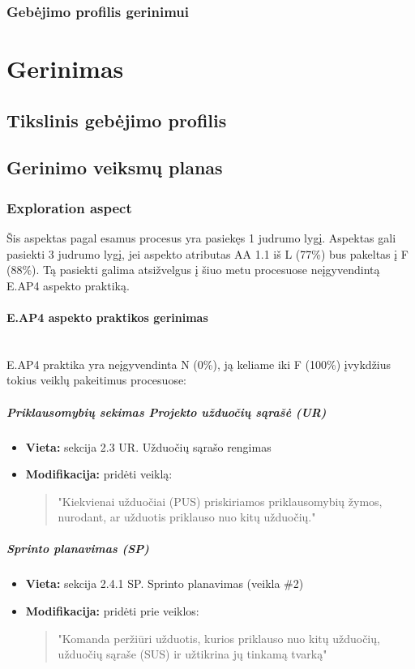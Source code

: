\documentclass{article}
\newcommand{\subsubsubsection}[1]{\paragraph{#1}\mbox{}\\}
\begin{document}
\subsubsection{Gebėjimo profilis gerinimui}


\section{Gerinimas}

\subsection{Tikslinis gebėjimo profilis}

\subsection{Gerinimo veiksmų planas}

\subsubsection{Exploration aspect}

Šis aspektas pagal esamus procesus yra pasiekęs 1 judrumo lygį. Aspektas gali pasiekti 3 judrumo lygį, jei aspekto atributas
AA 1.1 iš L (77\%) bus pakeltas į F (88\%). Tą pasiekti galima atsižvelgus į šiuo metu procesuose neįgyvendintą E.AP4 aspekto praktiką.

\pagebreak
\subsubsubsection{E.AP4 aspekto praktikos gerinimas}

E.AP4 praktika yra neįgyvendinta N (0\%), ją keliame iki F (100\%) įvykdžius tokius veiklų pakeitimus procesuose:

\subparagraph{Priklausomybių sekimas Projekto užduočių sąrašė (UR)}
\begin{itemize}
    \item \textbf{Vieta:} sekcija 2.3 UR. Užduočių sąrašo rengimas
    \item \textbf{Modifikacija:} pridėti veiklą:
    \begin{quote}
        "Kiekvienai užduočiai (PUS) priskiriamos priklausomybių žymos, nurodant, ar užduotis priklauso nuo kitų užduočių."
    \end{quote}
\end{itemize}

\subparagraph{Sprinto planavimas (SP)}
\begin{itemize}
    \item \textbf{Vieta:} sekcija 2.4.1 SP. Sprinto planavimas (veikla \#2)
    \item \textbf{Modifikacija:} pridėti prie veiklos:
    \begin{quote}
        "Komanda peržiūri užduotis, kurios priklauso nuo kitų užduočių, užduočių sąraše (SUS) ir užtikrina jų tinkamą tvarką"
    \end{quote}
\end{itemize}
\end{document}
